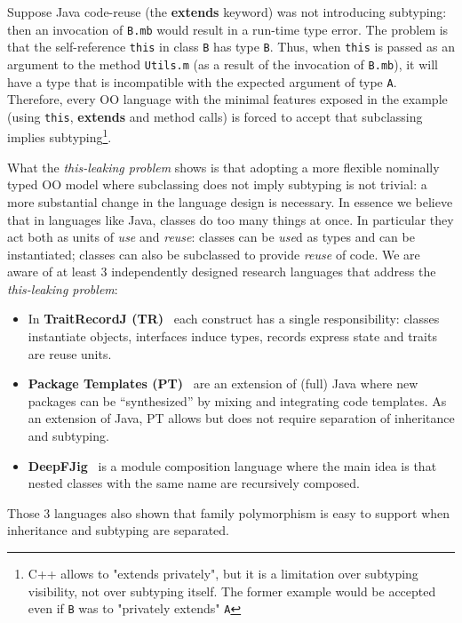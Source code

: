 Suppose Java code-reuse (the {\bf extends} keyword) was not introducing subtyping: then an invocation of 
\lstinline{B.mb} would result in a run-time type error.
The problem is that the
self-reference \lstinline{this} in class \lstinline{B} has 
type \lstinline{B}. Thus, when \lstinline{this} is passed as an argument to 
the method \lstinline{Utils.m} (as a result of the invocation of
\lstinline{B.mb}), it will have a type that is incompatible with the
expected argument of type \lstinline{A}.  
Therefore, every OO language with the minimal features exposed in the example (using \lstinline{this},
{\bf extends} and method calls) is forced to accept that subclassing implies
subtyping\footnote{C++ allows to "extends privately", but it is a limitation over
  subtyping visibility, not over subtyping itself.  The
  former example would be accepted even if \lstinline{B} was to
  "privately extends" \lstinline{A}}.
  

What the \emph{this-leaking problem} shows is that adopting a more flexible
nominally typed OO model where subclassing does not imply subtyping is
not trivial: a more substantial change in the language design is
necessary.  In essence we believe that in languages like Java, classes do too many
things at once. In particular they act both as units of \emph{use} and
\emph{reuse}: classes can be \emph{use}d as types and can be instantiated;
classes can also be subclassed to provide \emph{reuse} of code.
We are aware of at least 3 independently designed research
languages that address the \emph{this-leaking problem}:
\begin{itemize}
\item In {\bf TraitRecordJ (TR)}~\cite{Bettini:2010:ISP:1774088.1774530,BETTINI2013521,Bettini2015282}
each construct has a single responsibility: classes instantiate objects,
interfaces induce types, records express state and traits are reuse units.
\item {\bf Package Templates (PT)}~\cite{KrogdahlMS09,DBLP:journals/taosd/AxelsenSKM12,DBLP:conf/gpce/AxelsenK12}
are an extension of (full) Java where new packages can be ``synthesized'' by mixing
and integrating code templates. As an extension of Java, PT allows but does not require
separation of inheritance and subtyping.
\item {\bf
    DeepFJig}~\cite{deep,servetto2014meta,fjig} is
a module composition language where the main idea is that
nested classes with the same name are recursively composed.
\end{itemize}
Those 3 languages also shown that family polymorphism 
is easy to support when inheritance and subtyping are separated.


